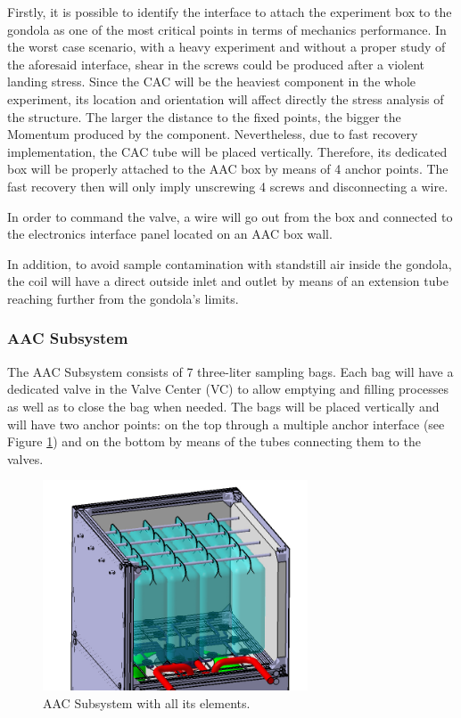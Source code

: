 \smallskip
Firstly, it is possible to identify the interface to attach the experiment box to the gondola as one of the most critical points in terms of mechanics performance. In the worst case scenario, with a heavy experiment and without a proper study of the aforesaid interface, shear in the screws could be produced after a violent landing stress. Since the CAC will be the heaviest component in the whole experiment, its location and orientation will affect directly the stress analysis of the structure. The larger the distance to the fixed points, the bigger the Momentum produced by the component. Nevertheless, due to fast recovery implementation, the CAC tube will be placed vertically. Therefore, its dedicated box will be properly attached to the AAC box by means of 4 anchor points. The fast recovery then will only imply unscrewing 4 screws and disconnecting a wire. 

\smallskip
In order to command the valve, a wire will go out from the box and connected to the electronics interface panel located on an AAC box wall.

\smallskip
In addition, to avoid sample contamination with standstill air inside the gondola, the coil will have a direct outside inlet and outlet by means of an extension tube reaching further from the gondola’s limits.


\pagebreak
\subsubsection{AAC Subsystem}

The AAC Subsystem consists of 7 three-liter sampling bags. Each bag will have a dedicated valve in the Valve Center (VC) to allow emptying and filling processes as well as to close the bag when needed. The bags will be placed vertically and will have two anchor points: on the top through a  multiple anchor interface (see Figure \ref{anchor_bags}) and on the bottom by means of the tubes connecting them to the valves.


\begin{figure}[!ht]
    \centering
    \includegraphics[width=0.7\textwidth]{4-experiment-design/img/anchored_bags.jpg}
    \caption{AAC Subsystem with all its elements.}
    \label{anchor_bags}
\end{figure}

